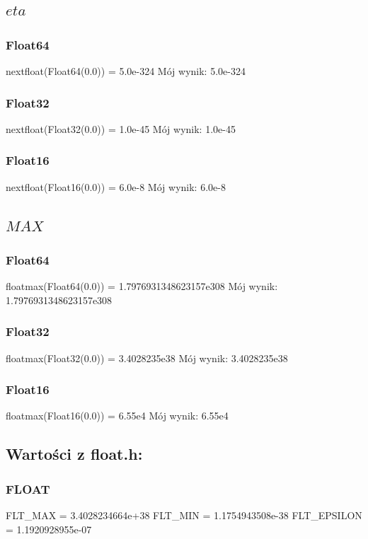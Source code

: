\documentclass{article}
\begin{document}
\subsection{$eta$}
\subsubsection{Float64}
nextfloat(Float64(0.0)) = 5.0e-324 \newline
Mój wynik: 5.0e-324
\subsubsection{Float32}
nextfloat(Float32(0.0)) = 1.0e-45 \newline
Mój wynik: 1.0e-45
\subsubsection{Float16}
nextfloat(Float16(0.0)) = 6.0e-8 \newline
Mój wynik: 6.0e-8
\subsection{$MAX$}
\subsubsection{Float64}
floatmax(Float64(0.0)) = 1.7976931348623157e308 \newline
Mój wynik: 1.7976931348623157e308 \newline
\subsubsection{Float32}
floatmax(Float32(0.0)) = 3.4028235e38 \newline
Mój wynik: 3.4028235e38 \newline
\subsubsection{Float16}
floatmax(Float16(0.0)) = 6.55e4 \newline
Mój wynik: 6.55e4 \newline
\subsection{Wartości z float.h:}
\subsubsection{FLOAT}
FLT\_MAX = 3.4028234664e+38 \newline
FLT\_MIN = 1.1754943508e-38 \newline
FLT\_EPSILON = 1.1920928955e-07 \newline
\end{document}
